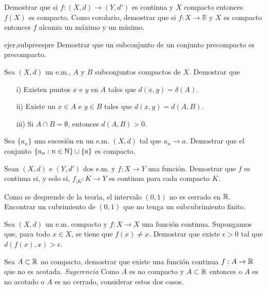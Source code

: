 \begin{ejercicio}{} Demostrar que si $f:(X,d)\to (Y,d')$ es continua
y $X$ compacto entonces $f(X)$ es compacto. Como corolario,
demostrar que si $f:X\to\mathbb{R}$ y $X$ es compacto entonces $f$
alcanza un máximo y un mínimo.
\end{ejercicio}

\begin{ejercicio}{ejer,subpreespre} Demostrar que un
subconjunto de un conjunto precompacto es precompacto.
\end{ejercicio}

\begin{ejercicio}{} Sea $(X,d)$ un e.m., $A$ y $B$ subconjuntos compactos de
$X$. Demostrar que
\begin{itemize}
    \item[i)] Existen puntos $x$ e $y$ en $A$ tales que $d(x,y)=\delta(A)$.
    \item[ii)] Existe un $x\in A$ e $y\in B$ tales que
    $d(x,y)=d(A,B)$.
    \item[iii)] Si $A\cap B=\emptyset$, entonces $d(A,B)>0$.
\end{itemize}
\end{ejercicio}
\begin{ejercicio}{} Sea $\{a_n\}$ una sucesi\'on en un e.m. $(X,d)$
tal que $a_n\to a$. Demostrar que el conjunto
$\{a_n:n\in\mathbb{N}\}\cup\{a\}$ es compacto.
\end{ejercicio}

\begin{ejercicio}{} Sean $(X,d)$ e $(Y,d')$ dos e.m. y $f:X\to Y$
una funci\'on. Demostrar que $f$ es continua si, y solo si,
$f_{|K}:K\to Y$ es continua para cada compacto $K$.
\end{ejercicio}


\begin{ejercicio}{} Como se desprende de la teor\'{\i}a, el intervalo
$(0,1)$ no es cerrado en $\mathbb{R}$. Encontrar un cubrimiento de
$(0,1)$ que no tenga un subcubrimiento finito.
\end{ejercicio}

\begin{ejercicio}{} Sea $(X,d)$ un e.m. compacto y $f:X\to X$ una
funci\'on continua. Supongamos que, para todo $x\in X$, se tiene
que $f(x)\neq x$. Demostrar que existe $\epsilon>0$ tal que
$d(f(x),x)>\epsilon$.
\end{ejercicio}

\begin{ejercicio}{} Sea $A\subset\mathbb{R}$ no compacto, demostrar que
existe una funci\'on continua $f:A\to\mathbb{R}$ que no es acotada.
\emph{Sugerencia} Como $A$ es no compacto y $A\subset \mathbb{R}$
entonces o $A$ es no acotado o $A$ es no cerrado, considerar estos
dos casos.
\end{ejercicio}


